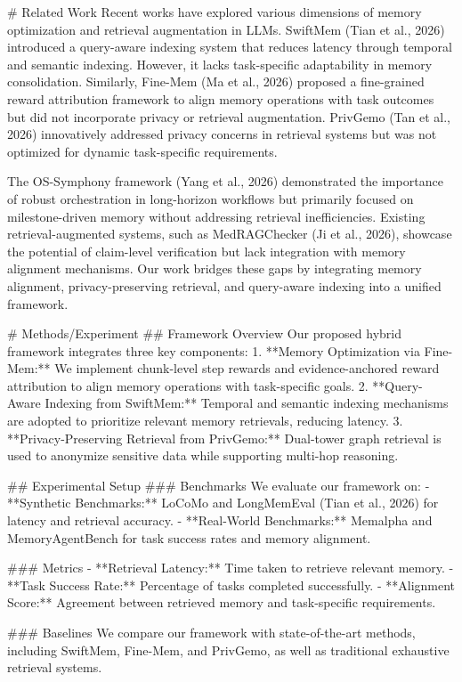 # Related Work  
Recent works have explored various dimensions of memory optimization and retrieval augmentation in LLMs. SwiftMem (Tian et al., 2026) introduced a query-aware indexing system that reduces latency through temporal and semantic indexing. However, it lacks task-specific adaptability in memory consolidation. Similarly, Fine-Mem (Ma et al., 2026) proposed a fine-grained reward attribution framework to align memory operations with task outcomes but did not incorporate privacy or retrieval augmentation. PrivGemo (Tan et al., 2026) innovatively addressed privacy concerns in retrieval systems but was not optimized for dynamic task-specific requirements.

The OS-Symphony framework (Yang et al., 2026) demonstrated the importance of robust orchestration in long-horizon workflows but primarily focused on milestone-driven memory without addressing retrieval inefficiencies. Existing retrieval-augmented systems, such as MedRAGChecker (Ji et al., 2026), showcase the potential of claim-level verification but lack integration with memory alignment mechanisms. Our work bridges these gaps by integrating memory alignment, privacy-preserving retrieval, and query-aware indexing into a unified framework.

# Methods/Experiment  
## Framework Overview  
Our proposed hybrid framework integrates three key components:  
1. **Memory Optimization via Fine-Mem:** We implement chunk-level step rewards and evidence-anchored reward attribution to align memory operations with task-specific goals.  
2. **Query-Aware Indexing from SwiftMem:** Temporal and semantic indexing mechanisms are adopted to prioritize relevant memory retrievals, reducing latency.  
3. **Privacy-Preserving Retrieval from PrivGemo:** Dual-tower graph retrieval is used to anonymize sensitive data while supporting multi-hop reasoning.

## Experimental Setup  
### Benchmarks  
We evaluate our framework on:  
- **Synthetic Benchmarks:** LoCoMo and LongMemEval (Tian et al., 2026) for latency and retrieval accuracy.  
- **Real-World Benchmarks:** Memalpha and MemoryAgentBench for task success rates and memory alignment.  

### Metrics  
- **Retrieval Latency:** Time taken to retrieve relevant memory.  
- **Task Success Rate:** Percentage of tasks completed successfully.  
- **Alignment Score:** Agreement between retrieved memory and task-specific requirements.  

### Baselines  
We compare our framework with state-of-the-art methods, including SwiftMem, Fine-Mem, and PrivGemo, as well as traditional exhaustive retrieval systems.

